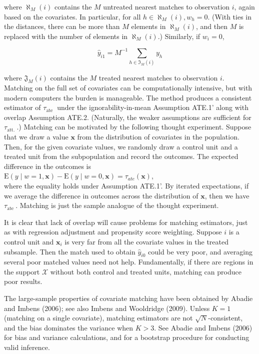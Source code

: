 \documentclass[10pt]{article}
\begin{document}
where $\aleph_{M}(i)$ contains the $M$ untreated nearest matches to observation $i$, again based on the covariates. In particular, for all $h \in \aleph_{M}(i), w_{h}=0$. (With ties in the distances, there can be more than $M$ elements in $\aleph_{M}(i)$, and then $M$ is replaced with the number of elements in $\aleph_{M}(i)$.) Similarly, if $w_{i}=0$,


\begin{equation*}
\hat{y}_{i 1}=M^{-1} \sum_{h \in \mathfrak{I}_{M}(i)} y_{h} \tag{21.59}
\end{equation*}


where $\mathfrak{J}_{M}(i)$ contains the $M$ treated nearest matches to observation $i$.\\
Matching on the full set of covariates can be computationally intensive, but with modern computers the burden is manageable. The method produces a consistent estimator of $\tau_{\text {ate }}$ under the ignorability-in-mean Assumption ATE.1' along with overlap Assumption ATE.2. (Naturally, the weaker assumptions are sufficient for $\tau_{\text {att. }}$.) Matching can be motivated by the following thought experiment. Suppose that we draw a value $\mathbf{x}$ from the distribution of covariates in the population. Then, for the given covariate values, we randomly draw a control unit and a treated unit from the subpopulation and record the outcomes. The expected difference in the outcomes is\\
$\mathrm{E}(y \mid w=1, \mathbf{x})-\mathrm{E}(y \mid w=0, \mathbf{x})=\tau_{a t e}(\mathbf{x})$,\\
where the equality holds under Assumption ATE.1'. By iterated expectations, if we average the difference in outcomes across the distribution of $\mathbf{x}$, then we have $\tau_{\text {ate }}$. Matching is just the sample analogue of the thought experiment.

It is clear that lack of overlap will cause problems for matching estimators, just as with regression adjustment and propensity score weighting. Suppose $i$ is a control unit and $\mathbf{x}_{i}$ is very far from all the covariate values in the treated subsample. Then the match used to obtain $\hat{y}_{i 0}$ could be very poor, and averaging several poor matched values need not help. Fundamentally, if there are regions in the support $\mathscr{X}$ without both control and treated units, matching can produce poor results.

The large-sample properties of covariate matching have been obtained by Abadie and Imbens (2006); see also Imbens and Wooldridge (2009). Unless $K=1$ (matching on a single covariate), matching estimators are not $\sqrt{N}$-consistent, and the bias dominates the variance when $K>3$. See Abadie and Imbens (2006) for bias and variance calculations, and for a bootstrap procedure for conducting valid inference.
\end{document}
